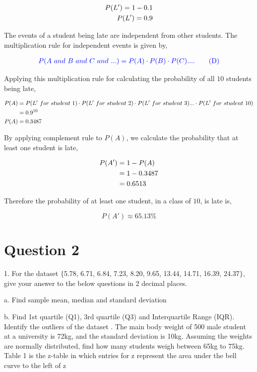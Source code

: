 \documentclass[a4paper]{report}
\begin{document}
\begin{align}
    \notag P(L')=1-0.1 \\ 
    P(L')=0.9
\end{align}


The events of a student being late are independent from other students. The multiplication rule for independent events is given by,

\begin{align*}
    \color{blue}P(A\ and\ B\ and\ C\ and\ ...) = P(A)\cdot P(B) \cdot P(C) .... \tag{D}
\end{align*}

Applying this multiplication rule for calculating the probability of all $10$ students being late,

\begin{align}
    \notag P(A)&=P(L'\ for\ student\ 1)\cdot P(L'\ for\ student\ 2)\cdot P(L'\ for\ student\ 3) ... \cdot P(L'\ for\ student\ 10) \\
    \notag &=0.9^{10} \\
    P(A)&=0.3487
\end{align}


By applying complement rule to $P(A)$, we calculate the probability that at least one student is late,

\begin{align}
    \notag P(A')&=1-P(A) \\
    \notag &=1-0.3487 \\
    \notag &=0.6513
\end{align}

Therefore the probability of at least one student, in a class of $10$, is late is,

\begin{equation*}
    \boxed{P(A')\approx65.13\%}
\end{equation*}




\newpage
\section*{Question 2}

1.	For the dataset $\{$5.78, 6.71, 6.84, 7.23, 8.20, 9.65, 13.44, 14.71, 16.39, 24.37$\}$, give your answer to the below questions in 2 decimal places. 

a. Find sample mean, median and standard deviation

b. Find 1st quartile (Q1), 3rd quartile (Q3) and Interquartile Range (IQR). Identify the outliers of the dataset      
.	The main body weight of 500 male student at a university is 72kg, and the standard deviation is 10kg. Assuming the weights are normally distributed, find how many students weigh between 65kg to 75kg. Table 1 is the z-table in which entries for z represent the area under the bell curve to the left of z    
\end{document}
